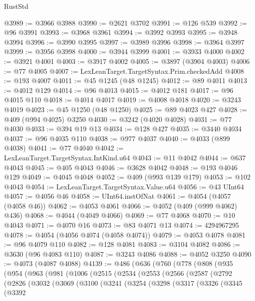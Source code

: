 \begin{lexlean}{RustStd}
\begin{coremodule}
@3989 := @3966 @3988
@3990 := @2621 @3702
@3991 := @126 @539
@3992 := @96 @3991
@3993 := @3968 @3961
@3994 := @3992 @3993
@3995 := @3948 @3994
@3996 := @3990 @3995
@3997 := @3989 @3996
@3998 := @3964 @3997
@3999 := @3956 @3998
@4000 := @3944 @3999
@4001 := @3933 @4000
@4002 := @3921 @4001
@4003 := @3917 @4002
@4005 := @3897 (@3904 @4003)
@4006 := @77 @4005
@4007 := LexLeanTarget.TargetSyntax.Prim.checkedAdd
@4008 := @193 @4007
@4011 := @45 @1245 (@48 @1245)
@4012 := @89 @4011
@4013 := @4012 @129
@4014 := @96 @4013
@4015 := @4012 @181
@4017 := @96 @4015 @110
@4018 := @4014 @4017
@4019 := @4008 @4018
@4020 := @3243 @4019
@4023 := @45 @1250 (@48 @1250)
@4025 := @89 @4023 @427
@4028 := @409 (@994 @4025) @3250
@4030 := @3242 (@4020 @4028)
@4031 := @77 @4030
@4033 := @394 @19 @13
@4034 := @128 @427
@4035 := @3440 @4034
@4037 := @96 @4035 @110
@4038 := @977 @4037
@4040 := @4033 (@899 @4038)
@4041 := @77 @4040
@4042 := LexLeanTarget.TargetSyntax.IntKind.u64
@4043 := @11 @4042
@4044 := @637 @4043
@4045 := @405 @4043
@4046 := @3628 @4042
@4048 := @193 @4046 @129
@4049 := @4045 @4048
@4052 := @409 (@993 @139 @179)
@4053 := @102 @4043
@4054 := LexLeanTarget.TargetSyntax.Value.u64
@4056 := @43 UInt64
@4057 := @4056 @46
@4058 := UInt64.instOfNat
@4061 := @4054 (@4057 (@4058 @46))
@4062 := @4053 @4061
@4066 := @4052 (@409 (@999 @4062) @436)
@4068 := @4044 (@4049 @4066)
@4069 := @77 @4068
@4070 := @10 @4043
@4071 := @4070 @16
@4073 := @83 @4071 @13
@4074 := 4294967295
@4078 := @4054 (@4056 @4074 (@4058 @4074))
@4079 := @4053 @4078
@4081 := @96 @4079 @110
@4082 := @128 @4081
@4083 := @3104 @4082
@4086 := @3630 (@96 @4083 @110)
@4087 := @3243 @4086
@4088 := @4052 @3250
@4090 := @4073 (@4087 @4088)
@4139 := @486
    (@636
      (@760
        (@778
          (@808
            (@935
              (@954
                (@963
                  (@981
                    (@1006
                      (@2515
                        (@2534
                          (@2553
                            (@2566
                              (@2587
                                (@2792
                                  (@2826
                                    (@3032
                                      (@3069
                                        (@3100
                                          (@3241
                                            (@3254
                                              (@3298
                                                (@3317
                                                  (@3326
                                                    (@3345
                                                      (@3392

\end{coremodule}
\end{lexlean}
